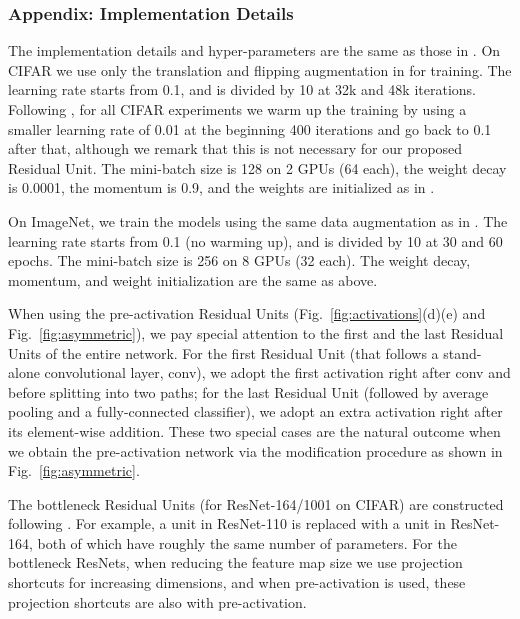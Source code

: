 \documentclass[runningheads]{llncs}
\begin{document}
\subsubsection*{Appendix: Implementation Details}

The implementation details and hyper-parameters are the same as those in \cite{He2016}. On CIFAR we use only the translation and flipping augmentation in \cite{He2016} for training. The learning rate starts from 0.1, and is divided by 10 at 32k and 48k iterations. Following \cite{He2016}, for all CIFAR experiments we warm up the training by using a smaller learning rate of 0.01 at the beginning 400 iterations and go back to 0.1 after that, although we remark that this is not necessary for our proposed Residual Unit. The mini-batch size is 128 on 2 GPUs (64 each), the weight decay is 0.0001, the momentum is 0.9, and the weights are initialized as in \cite{He2015}.

On ImageNet, we train the models using the same data augmentation as in \cite{He2016}. The learning rate starts from 0.1 (no warming up), and is divided by 10 at 30 and 60 epochs. The mini-batch size is 256 on 8 GPUs (32 each). The weight decay, momentum, and weight initialization are the same as above.

When using the pre-activation Residual Units (Fig.~\ref{fig:activations}(d)(e) and Fig.~\ref{fig:asymmetric}), we pay special attention to the first and the last Residual Units of the entire network. For the first Residual Unit (that follows a stand-alone convolutional layer, conv), we adopt the first activation right after conv and before splitting into two paths; for the last Residual Unit (followed by average pooling and a fully-connected classifier), we adopt an extra activation right after its element-wise addition.
These two special cases are the natural outcome when we obtain the pre-activation network via the modification procedure as shown in Fig.~\ref{fig:asymmetric}.

\newcommand{\blocka}[1]{\tiny \begin{tabular}{c} \end{tabular}
}
\newcommand{\blockb}[2]{\tiny \begin{tabular}{c} -.1em] \text{33, #2}\\end{tabular}
}

The bottleneck Residual Units (for ResNet-164/1001 on CIFAR) are constructed following \cite{He2016}. For example, a  unit in ResNet-110 is replaced with a  unit in ResNet-164, both of which have roughly the same number of parameters. For the bottleneck ResNets, when reducing the feature map size we use projection shortcuts \cite{He2016} for increasing dimensions, and when pre-activation is used, these projection shortcuts are also with pre-activation.



\end{document}
